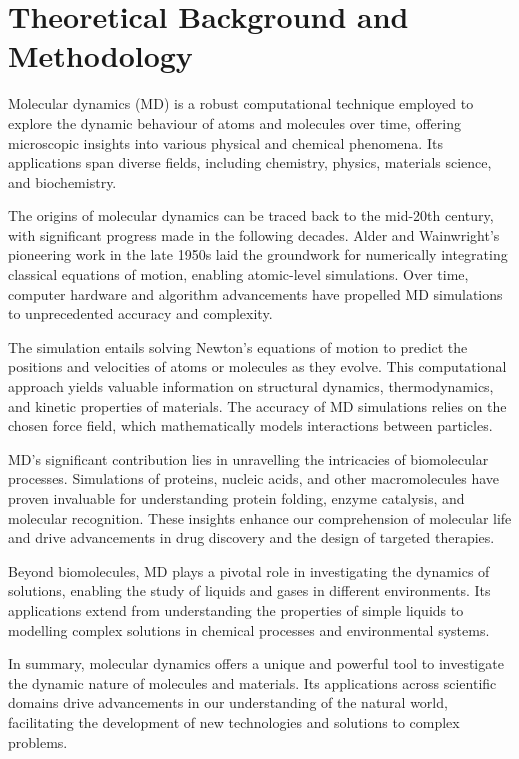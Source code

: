 \chapter[Theoretical Background and Methodology]{Theoretical Background and Methodology}
Molecular dynamics (MD) is a robust computational technique employed to explore the dynamic behaviour of atoms and molecules over time, offering microscopic insights into various physical and chemical phenomena. Its applications span diverse fields, including chemistry, physics, materials science, and biochemistry.

The origins of molecular dynamics can be traced back to the mid-20th century, with significant progress made in the following decades. Alder and Wainwright's pioneering work in the late 1950s laid the groundwork for numerically integrating classical equations of motion, enabling atomic-level simulations.\supercite{alder_studies_1959} Over time, computer hardware and algorithm advancements have propelled MD simulations to unprecedented accuracy and complexity.

The simulation entails solving Newton's equations of motion to predict the positions and velocities of atoms or molecules as they evolve. This computational approach yields valuable information on structural dynamics, thermodynamics, and kinetic properties of materials. The accuracy of MD simulations relies on the chosen force field, which mathematically models interactions between particles.

MD's significant contribution lies in unravelling the intricacies of biomolecular processes. Simulations of proteins, nucleic acids, and other macromolecules have proven invaluable for understanding protein folding, enzyme catalysis, and molecular recognition. These insights enhance our comprehension of molecular life and drive advancements in drug discovery and the design of targeted therapies.

Beyond biomolecules, MD plays a pivotal role in investigating the dynamics of solutions, enabling the study of liquids and gases in different environments. Its applications extend from understanding the properties of simple liquids to modelling complex solutions in chemical processes and environmental systems.

In summary, molecular dynamics offers a unique and powerful tool to investigate the dynamic nature of molecules and materials. Its applications across scientific domains drive advancements in our understanding of the natural world, facilitating the development of new technologies and solutions to complex problems.

